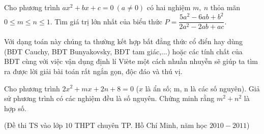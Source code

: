 \begin{vd}%
	Cho phương trình $ax^2+bx+c=0~(a \ne 0)$ có hai nghiệm $m,~n$ thỏa mãn $0 \leqslant m \leqslant n \leqslant 1.$ Tìm giá trị lớn nhất của biểu thức $P=\dfrac{5a^2-6ab+b^2}{2a^2-2ab+ac}.$
\end{vd}
 Với dạng toán này chúng ta thường kết hợp bất đẳng thức cổ điển hay dùng (BĐT Cauchy, BĐT Bunyakovsky, BĐT tam giác,...) hoặc các tính chất của BĐT cùng với việc vận dụng định lí Viète một cách nhuần nhuyễn sẽ giúp ta tìm ra được lời giải bài toán rất ngắn gọn, độc đáo và thú vị.
	

\begin{vd}%
	Cho phương trình $2x^2+mx+2n+8=0$ ($x$ là ẩn số; m, n là các số nguyên). Giả sử phương trình có các nghiệm đều là số nguyên. Chứng minh rằng $m^2+n^2$ là hợp số.
	\begin{center}
		(Đề thi TS vào lớp $10$ THPT chuyên TP. Hồ Chí Minh, năm học $2010-2011$)
	\end{center}
\end{vd}

